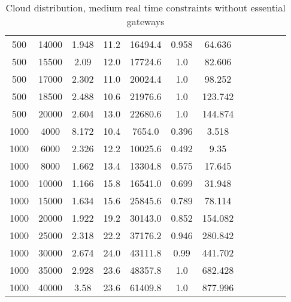 \begin{table}[htb]
\begin{tabular}{|c|c|c|c|c|c|c|c|c|c|c|c|}
		500 & 14000 & 1.948 & 11.2 & 16494.4 & 0.958 & 64.636 & & & & &  \\ 
		500 & 15500 & 2.09 & 12.0 & 17724.6 & 1.0 & 82.606 & & & & &  \\ 
		500 & 17000 & 2.302 & 11.0 & 20024.4 & 1.0 & 98.252 & & & & &  \\ 
		500 & 18500 & 2.488 & 10.6 & 21976.6 & 1.0 & 123.742 & & & & &  \\ 
		500 & 20000 & 2.604 & 13.0 & 22680.6 & 1.0 & 144.874 & & & & &  \\ 
		1000 & 4000 & 8.172 & 10.4 & 7654.0 & 0.396 & 3.518 & & & & &  \\ 
		1000 & 6000 & 2.326 & 12.2 & 10025.6 & 0.492 & 9.35 & & & & &  \\ 
		1000 & 8000 & 1.662 & 13.4 & 13304.8 & 0.575 & 17.645 & & & & &  \\ 
		1000 & 10000 & 1.166 & 15.8 & 16541.0 & 0.699 & 31.948 & & & & &  \\ 
		1000 & 15000 & 1.634 & 15.6 & 25845.6 & 0.789 & 78.114 & & & & &  \\ 
		1000 & 20000 & 1.922 & 19.2 & 30143.0 & 0.852 & 154.082 & & & & &  \\ 
		1000 & 25000 & 2.318 & 22.2 & 37176.2 & 0.946 & 280.842 & & & & &  \\ 
		1000 & 30000 & 2.674 & 24.0 & 43111.8 & 0.99 & 441.702 & & & & &  \\ 
		1000 & 35000 & 2.928 & 23.6 & 48357.8 & 1.0 & 682.428 & & & & &  \\ 
		1000 & 40000 & 3.58 & 23.6 & 61409.8 & 1.0 & 877.996 & & & & &  \\ 
		\hline 
	\end{tabular} 
	\caption{Cloud distribution, medium real time constraints without essential gateways} 
	\label{tab:cloud_medium_n_esc} 
\end{table} 

